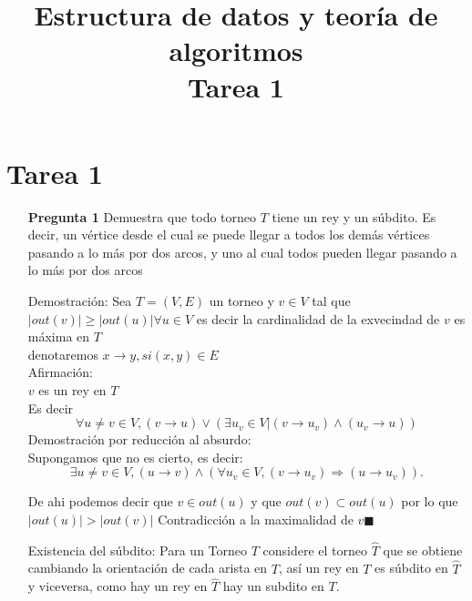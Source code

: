 \documentclass[12pt]{article}
\title{Estructura de datos y teoría de algoritmos\\
Tarea 1 }
\begin{document}
\lstset{language=python}

\section{Tarea 1}
\begin{itemize}
  \item[\bf{Pregunta 1}] Demuestra que todo torneo $T$ tiene un rey y un súbdito. Es decir, un vértice desde el cual se puede llegar a todos los demás vértices pasando a lo más por dos arcos, y uno al cual todos pueden llegar pasando a lo más por dos arcos

  \item[Demostración:]
    Sea $T=(V,E)$ un torneo y $ v \in V $ tal que $|out(v)| \ge |out(u)| \forall u\in V $ es decir la cardinalidad de la exvecindad de $v$ es máxima en $T$\\
    denotaremos $x \rightarrow  y, si (x,y)\in E$\\
    Afirmación:\\
    $v$ es un rey en $T$\\
    Es decir $$\forall u\ne v \in V ,  (v\rightarrow u) \vee (\exists u_v \in V  |  (v \rightarrow u_v) \wedge (u_v \rightarrow u))$$
    Demostración por reducción al absurdo:\\
    Supongamos que no es cierto, es decir:
    $$\exists u\ne v \in V ,  (u \rightarrow v) \wedge (\forall u_v \in V  ,  (v \rightarrow u_v)  \Rightarrow (u \rightarrow u_v)  ).$$
    
    De ahi podemos decir que $v \in out(u)$ y que $out(v)  \subset out(u)$ por lo que $|out(u)|>|out(v)|$ Contradicción a la maximalidad de $v \blacksquare$

  \item[Existencia del súbdito:]
    Para un Torneo $T$ considere el torneo $\widehat T$ que se obtiene cambiando la orientación de cada arista en $T$, así un rey en $T$ es súbdito en $\widehat T$ y viceversa, como hay un rey en $\widehat T$ hay un subdito en $T$.\\

\end{itemize}
\end{document}
